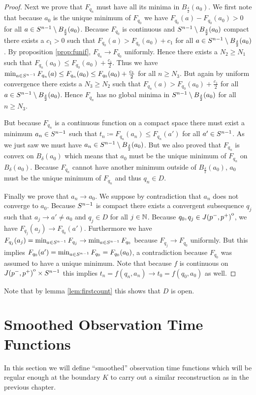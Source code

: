 \begin{proof}
    Next we prove that $F_{q_n}$ must have all its minima in $B_{\frac{\delta}{2}}(a_0)$. We first note that because $a_0$ is the unique minimum of $F_{q_0}$ we have $F_{q_0}(a)-F_{q_0}(a_0)>0$ for all $a\in {S^{n-1}}\setminus B_{\frac{\delta}{2}}(a_0)$. Because $F_{q_0}$ is continuous and ${S^{n-1}}\setminus B_{\frac{\delta}{2}}(a_0)$ compact there exists a $c_1>0$ such that $F_{q_0}(a)> F_{q_0}(a_0) + c_1$ for all $a\in {S^{n-1}}\setminus B_{\frac{\delta}{2}}(a_0)$. By proposition \ref{prop:funif}, $F_{q_n}\to F_{q_0}$ uniformly. Hence there exists a $N_2\ge N_1$ such that $F_{q_n}(a_0)\leq F_{q_0}(a_0)+\frac{c_1}{2}$. Thus we have $\min_{a\in {S^{n-1}}}F_{q_n}(a) \leq F_{q_n}(a_0) \leq F_{q_0}(a_0)+\frac{c_1}{2}$ for all $n\ge N_3$. But again by uniform convergence there exists a $N_3\ge N_2$ such that $F_{q_n}(a) > F_{q_0}(a_0)+\frac{c_1}{2}$ for all $a\in {S^{n-1}}\setminus B_{\frac{\delta}{2}}(a_0)$. Hence $F_{q_n}$ has no global minima in ${S^{n-1}}\setminus B_{\frac{\delta}{2}}(a_0)$ for all $n\ge N_3$.

    But because $F_{q_n}$ is a continuous function on a compact space there must exist a minimum $a_n\in {S^{n-1}}$ such that $t_n\coloneqq F_{q_n}(a_n)\leq F_{q_n}(a')$ for all $a'\in {S^{n-1}}$. As we just saw we must have $a_n \in {S^{n-1}}\setminus B_{\frac{\delta}{2}}(a_0)$. But we also proved that $F_{q_n}$ is convex on $B_\delta(a_0)$ which means that $a_0$ must be the unique minimum of $F_{q_n}$ on $B_\delta(a_0)$. Because $F_{q_n}$ cannot have another minimum outside of $B_{\frac{\delta}{2}}(a_0)$, $a_0$ must be the unique minimum of $F_{q_n}$ and thus $q_n \in D$.

    Finally we prove that $a_n\to a_0$. We suppose by contradiction that $a_n$ does not converge to $a_0$. Because ${S^{n-1}}$ is compact there exists a convergent subsequence $q_j$ such that $a_j \to a' \neq a_0$ and $q_j \in D$ for all $j\in \mathbb{N}$. Because $q_0,q_j\in {\kern0ptJ(p^-,p^+)}^{\mathrm{o}}$, we have $F_{q_j}(a_j) \to F_{q_0}(a')$. Furthermore we have $F_{q_j}(a_j)= \min_{a\in {S^{n-1}}}F_{q_j} \to \min_{a\in {S^{n-1}}}F_{q_0}$ because $F_{q_j}\to F_{q_0}$ uniformly. But this implies $F_{q_0}(a') = \min_{a\in {S^{n-1}}}F_{q_0}=F_{q_0}(a_0)$, a contradiction because $F_{q_0}$ was assumed to have a unique minimum. Note that because $f$ is continuous on ${\kern0ptJ(p^-,p^+)}^{\mathrm{o}}\times {S^{n-1}}$ this implies $t_n=f(q_n,a_n)\to t_0 = f(q_0,a_0)$ as well.
\end{proof}
Note that by lemma \ref{lem:firstcount} this shows that $D$ is open.

\section{Smoothed Observation Time Functions}
In this section we will define \enquote{smoothed} observation time functions which will be regular enough at the boundary $K$ to carry out a similar reconstruction as in the previous chapter.

